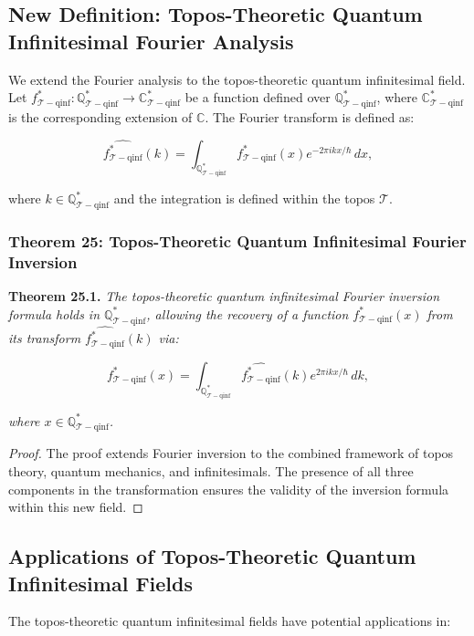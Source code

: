 \documentclass{article}
\begin{document}
\subsection{New Definition: Topos-Theoretic Quantum Infinitesimal Fourier Analysis}
We extend the Fourier analysis to the topos-theoretic quantum infinitesimal field. Let \(f_{\mathcal{T}-\text{qinf}}^*: \mathbb{Q}_{\mathcal{T}-\text{qinf}}^* \to \mathbb{C}_{\mathcal{T}-\text{qinf}}^*\) be a function defined over \(\mathbb{Q}_{\mathcal{T}-\text{qinf}}^*\), where \(\mathbb{C}_{\mathcal{T}-\text{qinf}}^*\) is the corresponding extension of \(\mathbb{C}\). The Fourier transform is defined as:

\[
\widehat{f_{\mathcal{T}-\text{qinf}}^*}(k) = \int_{\mathbb{Q}_{\mathcal{T}-\text{qinf}}^*} f_{\mathcal{T}-\text{qinf}}^*(x) e^{-2\pi i k x / \hbar} \, dx,
\]

where \(k \in \mathbb{Q}_{\mathcal{T}-\text{qinf}}^*\) and the integration is defined within the topos \(\mathcal{T}\).

\subsubsection{Theorem 25: Topos-Theoretic Quantum Infinitesimal Fourier Inversion}
\textbf{Theorem 25.1.} \textit{The topos-theoretic quantum infinitesimal Fourier inversion formula holds in \(\mathbb{Q}_{\mathcal{T}-\text{qinf}}^*\), allowing the recovery of a function \(f_{\mathcal{T}-\text{qinf}}^*(x)\) from its transform \(\widehat{f_{\mathcal{T}-\text{qinf}}^*}(k)\) via:}

\[
f_{\mathcal{T}-\text{qinf}}^*(x) = \int_{\mathbb{Q}_{\mathcal{T}-\text{qinf}}^*} \widehat{f_{\mathcal{T}-\text{qinf}}^*}(k) e^{2\pi i k x / \hbar} \, dk,
\]

\textit{where \(x \in \mathbb{Q}_{\mathcal{T}-\text{qinf}}^*\).}

\begin{proof}
The proof extends Fourier inversion to the combined framework of topos theory, quantum mechanics, and infinitesimals. The presence of all three components in the transformation ensures the validity of the inversion formula within this new field.
\end{proof}

\subsection{Applications of Topos-Theoretic Quantum Infinitesimal Fields}
The topos-theoretic quantum infinitesimal fields have potential applications in:
\end{document}
